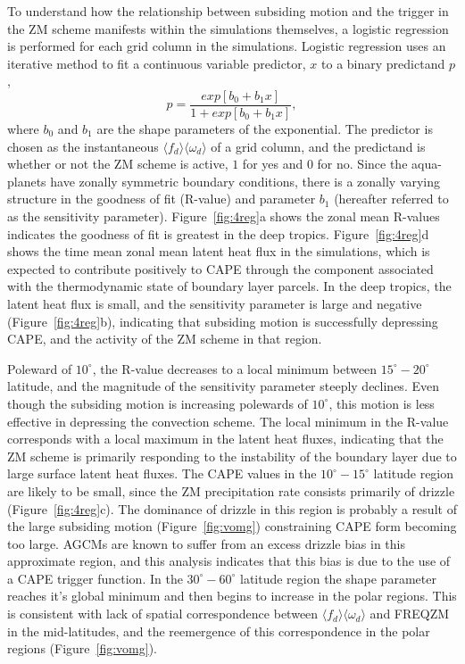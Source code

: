 To understand how the relationship between subsiding motion and the trigger in the ZM scheme manifests within the simulations themselves, a logistic regression is performed for each grid column in the simulations. Logistic regression uses an iterative method to fit a continuous variable predictor, $x$ to a binary predictand $p$ \citep{WILKSBOOK},
\begin{equation}
p = \frac{exp{[b_0 + b_1 x]}}{1 + exp{[b_0 + b_1 x]}}, \label{eq:eq6-3}
\end{equation}
where $b_0$ and $b_1$ are the shape parameters of the exponential. The predictor is chosen as the instantaneous $\langle f_{d} \rangle \langle \omega_{d} \rangle$ of a grid column, and the predictand is whether or not the ZM scheme is active, $1$ for yes and $0$ for no. Since the aqua-planets have zonally symmetric boundary conditions, there is a zonally varying structure in the goodness of fit (R-value) and parameter $b_1$ (hereafter referred to as the sensitivity parameter). Figure~\ref{fig:4reg}a shows the zonal mean R-values indicates the goodness of fit is greatest in the deep tropics. Figure~\ref{fig:4reg}d shows the time mean zonal mean latent heat flux in the simulations, which is expected to contribute positively to CAPE through the component associated with the thermodynamic state of boundary layer parcels. In the deep tropics, the latent heat flux is small, and the sensitivity parameter is large and negative (Figure~\ref{fig:4reg}b), indicating that subsiding motion is successfully depressing CAPE, and the activity of the ZM scheme in that region.

Poleward of $10^{\circ}$, the R-value decreases to a local minimum between $15^{\circ} - 20^{\circ}$ latitude, and the magnitude of the sensitivity parameter steeply declines. Even though the subsiding motion is increasing polewards of $10^{\circ}$, this motion is less effective in depressing the convection scheme. The local minimum in the R-value corresponds with a local maximum in the latent heat fluxes, indicating that the ZM scheme is primarily responding to the instability of the boundary layer due to large surface latent heat fluxes. The CAPE values in the $10^{\circ} - 15^{\circ}$ latitude region are likely to be small, since the ZM precipitation rate consists primarily of drizzle (Figure~\ref{fig:4reg}c). The dominance of drizzle in this region is probably a result of the large subsiding motion (Figure~\ref{fig:vomg}) constraining CAPE form becoming too large. AGCMs are known to suffer from an excess drizzle bias \citep{D2006JCLIM} in this approximate region, and this analysis indicates that this bias is due to the use of a CAPE trigger function. In the $30^{\circ} - 60^{\circ}$ latitude region the shape parameter reaches it's global minimum and then begins to increase in the polar regions. This is consistent with lack of spatial correspondence between $\langle f_{d} \rangle \langle \omega_{d} \rangle$ and FREQZM in the mid-latitudes, and the reemergence of this correspondence in the polar regions (Figure~\ref{fig:vomg}).


